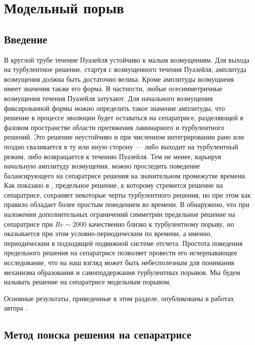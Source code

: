 
\chapter{Модельный порыв}

\section{Введение} 


В круглой трубе течение Пуазейля устойчиво к малым возмущениям. Для выхода на турбулентное решение, стартуя с возмущенного течения Пуазейля, амплитуда возмущения должна быть достаточно велика. Кроме амплитуды возмущнеия имеет значения также его форма. В частности, любые осесимметричные возмущения течения Пуазейля затухают. Для начального возмущения фиксированной формы можно определить такое значение амплитуды, что решение в процессе эволюции будет оставаться на сепаратрисе, разделяющей в фазовом пространстве области притяжения ламинарного и турбулентного решений. Это решение неустойчиво и при численном интегрировании рано или поздно сваливается в ту или иную сторону --- либо выходит на турбулентный режим, либо возвращается к течению Пуазейля. Тем не менее, варьируя начальную амплитуду возмущения, можно проследить поведение балансирующего на сепаратрисе решения на значительном промежутке времени. Как показано в \cite{Skufca2006}, предельное решение, к которому стремится решение на сепаратрисе, сохраняет некоторые черты турбулентного решения, но при этом как правило обладает более простым поведением во времени. В \cite{Avila2013} обнаружено, что при наложении дополнительных ограничений симметрии предельное решение на сепаратрисе при $Re\sim2000$ качественно близко к турбулентному порыву, но оказывается при этом условно-периодическим по времени, а именно, периодическим в подходящей подвижной системе отсчета. Простота поведения предельного решения на сепаратрисе позволяет провести его исчерпывающее исследование, что на наш взгляд может быть небесполезным для понимания  механизма образования и самоподдержания турбулентных порывов. Мы будем называть решение на сепаратрисе модельным порывом. 

Основные результаты, приведенные в этом разделе, опубликованы в работах автора    \cite{MZG2015, Kazan2015, MZG2017}. 

\section{Метод поиска решения на сепаратрисе}

